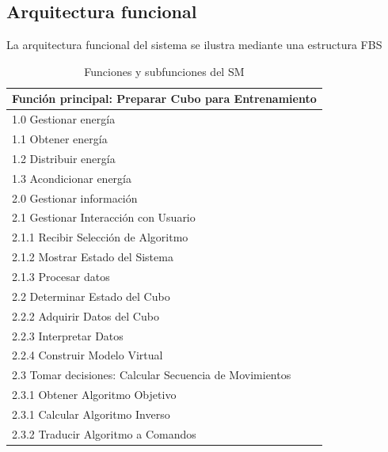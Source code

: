 \subsection{Arquitectura funcional}
La arquitectura funcional del sistema se ilustra mediante una estructura FBS
\renewcommand{\arraystretch}{0.7} %
\begin{table}[H]
	\centering
	\caption{Funciones y subfunciones del SM}
	\begin{tabular}{l}
		\toprule
\textbf{Función principal: Preparar Cubo para Entrenamiento} \\ \hline
1.0 \; Gestionar energía \\ 
\hspace{0.5cm} 1.1 \; Obtener energía \\
\hspace{0.5cm} 1.2 \; Distribuir energía \\
\hspace{0.5cm} 1.3 \; Acondicionar energía \\ \hline
2.0 \; Gestionar información \\
\hspace{0.5cm} 2.1 \; Gestionar Interacción con Usuario\\
\hspace{1cm} 2.1.1 \; Recibir Selección de Algoritmo \\
\hspace{1cm} 2.1.2 \; Mostrar Estado del Sistema \\
\hspace{1cm} 2.1.3 \; Procesar datos \\
\hspace{0.5cm} 2.2 \; Determinar Estado del Cubo \\
\hspace{1cm} 2.2.2 \; Adquirir Datos del Cubo \\
\hspace{1cm} 2.2.3 \; Interpretar Datos \\
\hspace{1cm} 2.2.4 \; Construir Modelo Virtual \\
\hspace{0.5cm} 2.3 \; Tomar decisiones: Calcular Secuencia de Movimientos \\
\hspace{1cm} 2.3.1 \; Obtener Algoritmo Objetivo \\
\hspace{1cm} 2.3.1 \; Calcular Algoritmo Inverso \\
\hspace{1cm} 2.3.2 \; Traducir Algoritmo a Comandos \\ \hline

\end{tabular}
\end{table}
